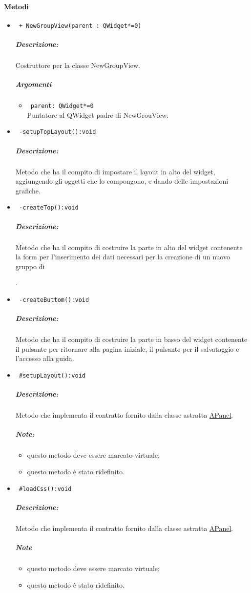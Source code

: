 \paragraph{\textcolor{black}{Metodi\\}}
\begin{itemize}
\item \color{blue}\verb! + NewGroupView(parent : QWidget*=0)!
\color{black}
\subparagraph{Descrizione:}
Costruttore per la classe NewGroupView. \\
\subparagraph{Argomenti}
\begin{itemize}
\item \color{RoyalPurple} \verb! parent: QWidget*=0 !\\ Puntatore al QWidget padre di NewGrouView.
\end{itemize}

\item \color{blue}\verb! -setupTopLayout():void!
\color{black} 
\subparagraph{Descrizione:}
Metodo che ha il compito di impostare il layout in alto del widget, aggiungendo gli oggetti che lo compongono, e dando delle impostazioni grafiche.

\item \color{blue}\verb! -createTop():void!
\color{black}
\subparagraph{Descrizione:} Metodo che ha il compito di costruire la parte in alto del widget contenente la form per l'inserimento dei dati necessari per la creazione di un nuovo gruppo di \subject{}.

\item \color{blue}\verb! -createButtom():void!
\color{black}
\subparagraph{Descrizione:}Metodo che ha il compito di costruire la parte in basso del widget contenente il pulsante per ritornare alla pagina iniziale, il pulsante per il salvataggio e l'accesso alla guida.

\item \color{blue}\verb! #setupLayout():void!
\color{black}
\subparagraph{Descrizione:}
Metodo che implementa il contratto fornito dalla classe astratta \hyperref[speAPanel]{APanel}.
\subparagraph{Note:}
\begin{itemize}
\item questo metodo deve essere marcato virtuale;
\item questo metodo è stato ridefinito.
\end{itemize}
 
\item \color{blue}\verb! #loadCss():void!
\color{black}
\subparagraph{Descrizione:}
Metodo che implementa il contratto fornito dalla classe astratta \hyperref[speAPanel]{APanel}.\\
 \subparagraph{Note}
 \begin{itemize}
  \item questo metodo deve essere marcato virtuale;
 \item questo metodo è stato ridefinito.
 \end{itemize}


\end{itemize}

